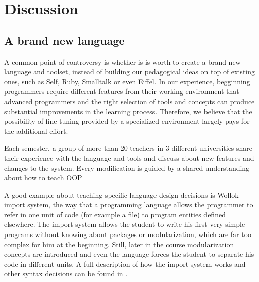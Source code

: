 \section{Discussion}
\label{sec:discussion}


\subsection{A brand new language}
\label{sec:newLanguage}
A common point of controversy is whether is is worth to create a brand new language and toolset, 
instead of building our pedagogical ideas on top of existing ones, such as Self, Ruby, Smalltalk or even Eiffel.
In our experience, begginning programmers require different features from their working environment that advanced programmers
and the right selection of tools and concepts can produce substantial improvements in the learning process.
Therefore, we believe that the possibility of fine tuning provided by a specialized environment largely pays for the additional effort.

Each semester, a group of more than 20 teachers in 3 different universities share their experience with the language and tools and discuss about new features and changes to the system. 
Every modification is guided by a shared understanding about how to teach OOP \cite{lombardi_instances_2007,lombardi_carlos_alumnos_2008,griggio_programming_2011,spigariol_lucas_ensenando_2013}

A good example about teaching-specific language-design decisions is Wollok import system,
\ie the way that a programming language allows the programmer to refer in one unit of code (for example a file) to program entities defined elsewhere.
The import system allows the student to write his first very simple programs without knowing about packages or modularization, which are far too complex for him at the beginning. Still, later in the course modularization concepts are introduced and even the language forces the student to separate his code in different units. 
A full description of how the import system works and other syntax decisions can be found in \cite{javier_fernandes_wollok_2014}.

